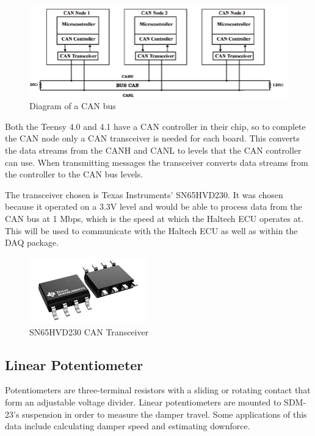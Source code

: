 \begin{figure}[H]
        \centering
        \includegraphics[width=5in]{images/iso11898-can.png}
        \caption{Diagram of a CAN bus}
        \label{fig:can-diagram}
\end{figure}
Both the Teensy 4.0 and 4.1 have a CAN controller in their chip, so to complete the CAN node only a CAN transceiver is needed for each board. This converts the data streams from the CANH and CANL to levels that the CAN controller can use. When transmitting messages the transceiver converts data streams from the controller to the CAN bus levels.
\vspace{1em}

The transceiver chosen is Texas Instruments' SN65HVD230.
It was chosen because it operated on a 3.3V level and would be able to process data from the CAN bus at 1 Mbps, which is the speed at which the Haltech ECU operates at.
This will be used to communicate with the Haltech ECU as well as within the DAQ package.
\begin{figure}[H]
        \centering
        \includegraphics[width=2in]{images/sn65hvd230chip.png}
        \caption{SN65HVD230 CAN Transceiver}
        \label{fig:sn65hvd230}
\end{figure}

\subsection{Linear Potentiometer}
Potentiometers are three-terminal resistors with a sliding or rotating contact that form an adjustable voltage divider.
Linear potentiometers are mounted to SDM-23's suspension in order to measure the damper travel.
Some applications of this data include calculating damper speed and estimating downforce.
\vspace{1em}

